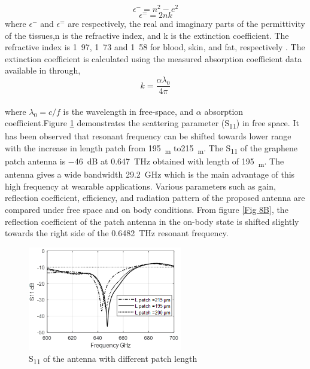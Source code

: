 \documentclass[12pt]{suhbook}
\begin{document}
\begin{equation}
   \epsilon^- =n^2-e^2
   \label{eq:real perimttivity}
\end{equation}
\begin{equation}
\epsilon^= =2nk
\label{eq:imag perimttivity}
\end{equation}
where $\epsilon^-$ and $\epsilon^=$ are respectively, the real and imaginary parts of the permittivity of the tissues,\si{n} is the refractive index, and \si{k} is the extinction coefficient. The refractive index is \si{1.97}, \si{1.73} and \si{1.58} for blood, skin, and fat, respectively \cite{yang2015numerical}. The extinction coefficient is calculated using the measured absorption coefficient data available in \cite{fitzgerald2003catalogue} \cite{berry2003optical} through,
\begin{equation}
k=\frac{\alpha\lambda_0}{4\pi}
\label{eq:abdorption}
\end{equation}
\\where $\lambda_0 = c/f$ is the wavelength in free-space, and $\alpha$  absorption coefficient.Figure \ref{Fig 8AE} demonstrates the scattering parameter (\si{S_{11}}) in free space. It has been observed that resonant frequency can be shifted towards lower range with the increase in length patch from \SI{195}{\mu_m} to\SI{215}{\mu_m}. The \si{S_{11}} of the graphene patch antenna is \SI{-46}{\deci\bel} at \SI{0.647}{\THz} obtained with length of \SI{195}{\nu_m}. The antenna gives a wide bandwidth \SI{29.2}{\GHz} which is the main advantage of this high frequency at wearable applications. Various parameters such as gain, reflection coefficient, efficiency, and radiation pattern of the proposed antenna are compared under free space and on body conditions. From figure \ref{Fig 8B}, the reflection coefficient of the patch antenna in the on-body state is shifted slightly towards the right side of the \SI{0.6482}{\THz} resonant frequency.\\
\begin{figure}[hbt!]
    \centering
    \includegraphics[width=0.6\textwidth]{9}
    \caption{\si{S_{11}} of the antenna with different patch length}
    \label{Fig 8AE}
\end{figure}
\end{document}
